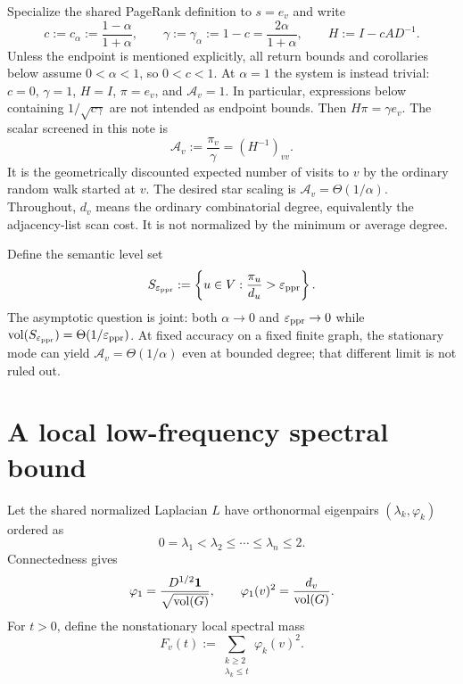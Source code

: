 \documentclass[11pt]{article}
\begin{document}
Specialize the shared PageRank definition to $s=e_v$ and write
\begin{equation}
 c:=c_{\alpha}:=\frac{1-\alpha}{1+\alpha},
 \qquad
 \gamma:=\gamma_{\alpha}:=1-c=\frac{2\alpha}{1+\alpha},
 \qquad
 H:=I-cAD^{-1}.
 \label{eq:bounded-return-parameters}
\end{equation}
Unless the endpoint is mentioned explicitly, all return bounds and
corollaries below assume $0<\alpha<1$, so $0<c<1$.  At $\alpha=1$ the
system is instead trivial: $c=0$, $\gamma=1$, $H=I$, $\pi=e_v$, and
$\mathcal A_v=1$.  In particular, expressions below containing
$1/\sqrt{c\gamma}$ are not intended as endpoint bounds.
Then $H\pi=\gamma e_v$.  The scalar screened in this note is
\begin{equation}
 \mathcal A_v:=\frac{\pi_v}{\gamma}=(H^{-1})_{vv}.
 \label{eq:bounded-return-amplification}
\end{equation}
It is the geometrically discounted expected number of visits to $v$ by the
ordinary random walk started at $v$.  The desired star scaling is
$\mathcal A_v=\Theta(1/\alpha)$.  Throughout, $d_v$ means the ordinary
combinatorial degree, equivalently the adjacency-list scan cost.  It is not
normalized by the minimum or average degree.

Define the semantic level set
\begin{equation}
 S_{\varepsilon_{\mathrm{ppr}}}:=\left\{u\in V:\frac{\pi_u}{d_u}>\varepsilon_{\mathrm{ppr}}\right\}.
 \label{eq:bounded-return-semantic-support}
\end{equation}
The asymptotic question is joint: both $\alpha\to0$ and $\varepsilon_{\mathrm{ppr}}\to0$ while
$\operatorname{vol}(S_{\varepsilon_{\mathrm{ppr}}})=\Theta(1/\varepsilon_{\mathrm{ppr}})$.  At fixed accuracy on a fixed finite
graph, the stationary mode can yield $\mathcal A_v=\Theta(1/\alpha)$ even at
bounded degree; that different limit is not ruled out.

\section{A local low-frequency spectral bound}
\label{sec:bounded-return-spectral}

Let the shared normalized Laplacian $L$ have orthonormal eigenpairs
$(\lambda_k,\varphi_k)$ ordered as
\[
 0=\lambda_1<\lambda_2\le\cdots\le\lambda_n\le2.
\]
Connectedness gives
\begin{equation}
 \varphi_1=\frac{D^{1/2}\mathbf{1}}{\sqrt{\operatorname{vol}(G)}},
 \qquad
 \varphi_1(v)^2=\frac{d_v}{\operatorname{vol}(G)}.
 \label{eq:bounded-return-stationary-mode}
\end{equation}
For $t>0$, define the nonstationary local spectral mass
\begin{equation}
 F_v(t):=\sum_{\substack{k\ge2\\\lambda_k\le t}}\varphi_k(v)^2.
 \label{eq:bounded-return-spectral-mass}
\end{equation}
\end{document}

